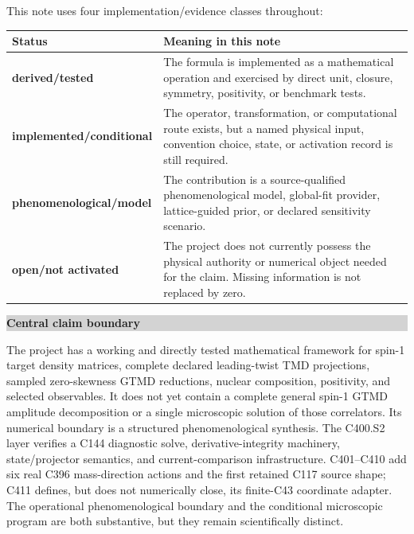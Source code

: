 \documentclass[11pt,oneside]{book}
\newcommand{\statusderived}{\textcolor{derivedgreen}{\textbf{derived/tested}}}
\newcommand{\statusconditional}{\textcolor{conditionalorange}{\textbf{implemented/conditional}}}
\newcommand{\statusmodel}{\textcolor{modelblue}{\textbf{phenomenological/model}}}
\newcommand{\statusopen}{\textcolor{warningred}{\textbf{open/not activated}}}
\newenvironment{claimbox}[1]{%
  \begin{center}\begin{minipage}{0.94\textwidth}
  \colorbox{lightgray}{\parbox{0.96\textwidth}{\textbf{#1}}}\smallskip\par
}{%
  \end{minipage}\end{center}
}
\begin{document}
This note uses four implementation/evidence classes throughout:

\begin{longtable}{@{}p{}p{}@{}}
\toprule
\textbf{Status} & \textbf{Meaning in this note}\\
\midrule
\statusderived & The formula is implemented as a mathematical operation and exercised by direct unit, closure, symmetry, positivity, or benchmark tests.\\
\statusconditional & The operator, transformation, or computational route exists, but a named physical input, convention choice, state, or activation record is still required.\\
\statusmodel & The contribution is a source-qualified phenomenological model, global-fit provider, lattice-guided prior, or declared sensitivity scenario.\\
\statusopen & The project does not currently possess the physical authority or numerical object needed for the claim.  Missing information is not replaced by zero.\\
\bottomrule
\end{longtable}

\begin{claimbox}{Central claim boundary}
The project has a working and directly tested mathematical framework for spin-1 target density matrices, complete declared leading-twist TMD projections, sampled zero-skewness GTMD reductions, nuclear composition, positivity, and selected observables.  It does not yet contain a complete general spin-1 GTMD amplitude decomposition or a single microscopic solution of those correlators.  Its numerical boundary is a structured phenomenological synthesis.  The C400.S2 layer verifies a C144 diagnostic solve, derivative-integrity machinery, state/projector semantics, and current-comparison infrastructure.  C401--C410 add six real C396 mass-direction actions and the first retained C117 source shape; C411 defines, but does not numerically close, its finite-C43 coordinate adapter.  The operational phenomenological boundary and the conditional microscopic program are both substantive, but they remain scientifically distinct.
\end{claimbox}
\end{document}
